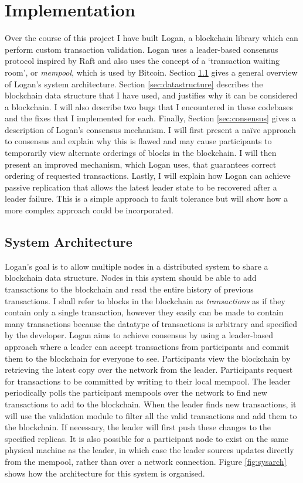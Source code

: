 \documentclass[12pt,a4paper,twoside,openright]{report}
\begin{document}
	\chapter{Implementation} \label{Implementation}
	Over the course of this project I have built Logan, a blockchain library which can perform custom transaction validation.
	Logan uses a leader-based consensus protocol inspired by Raft \parencite{Raft} and also uses the concept of a `transaction waiting room', or \textit{mempool}, which is used by Bitcoin.
	Section \ref{sec:sysarch} gives a general overview of Logan's system architecture.
	Section \ref{sec:datastructure} describes the blockchain data structure that I have used, and justifies why it can be considered a blockchain.
	I will also describe two bugs that I encountered in these codebases and the fixes that I implemented for each.
	Finally, Section \ref{sec:consensus} gives a description of Logan's consensus mechanism. 
	I will first present a na\"{i}ve approach to consensus and explain why this is flawed and may cause participants to temporarily view alternate orderings of blocks in the blockchain.
	I will then present an improved mechanism, which Logan uses, that guarantees correct ordering of requested transactions.
	Lastly, I will explain how Logan can achieve passive replication that allows the latest leader state to be recovered after a leader failure.
	This is a simple approach to fault tolerance but will show how a more complex approach could be incorporated.

	\section{System Architecture}\label{sec:sysarch}
	Logan's goal is to allow multiple nodes in a distributed system to share a blockchain data structure.
	Nodes in this system should be able to add transactions to the blockchain and read the entire history of previous transactions.
	I shall refer to blocks in the blockchain as \textit{transactions} as if they contain only a single transaction, however they easily can be made to contain many transactions because the datatype of transactions is arbitrary and specified by the developer.
	Logan aims to achieve consensus by using a leader-based approach where a leader can accept transactions from participants and commit them to the blockchain for everyone to see.
	Participants view the blockchain by retrieving the latest copy over the network from the leader.
	Participants request for transactions to be committed by writing to their local mempool. 
	The leader periodically polls the participant mempools over the network to find new transactions to add to the blockchain.
	When the leader finds new transactions, it will use the validation module to filter all the valid transactions and add them to the blockchain.
	If necessary, the leader will first push these changes to the specified replicas.
	It is also possible for a participant node to exist on the same physical machine as the leader, in which case the leader sources updates directly from the mempool, rather than over a network connection. 
	Figure \ref{fig:sysarch} shows how the architecture for this system is organised.\\	
\end{document}
